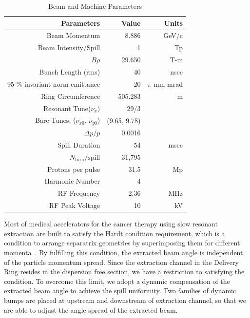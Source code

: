 \documentclass[aps,prstab,onecolumn,preprint,endfloats,11pt]{revtex4-1}
\begin{document}
\begin{table}[hbp]
    \begin{tabular}{rrr}
    \hline
     Parameters                & Value              & Units         \\
    \hline
      Beam Momentum     & 8.886    & GeV/c   \\
      Beam Intensity/Spill         &  1 & Tp       \\
      $B \rho$                  & 29.650             & T-m           \\
      Bunch Length (rms)        & 40                 & nsec          \\
      95 \% invariant norm emittance & 20     & $\pi$ mm-mrad \\
      Ring Circumference  & 505.283            & m             \\
      Resonant Tune($\nu_{x})$   & 29/3 &  \\
      Bare Tunes, ($\nu_{x0}$, $\nu_{y0}$)   & (9.65, 9.78)   &    \\
      $\Delta p / p$           & 0.0016         &    \\
      Spill Duration &  54  & msec \\
      $N_{\text{turn}} / {\text{spill}}$    & 31,795   &    \\
      Protons per pulse     & 31.5  &  Mp   \\
      Harmonic Number           & 4                  &               \\
      RF Frequency              & 2.36               & MHz           \\
      RF Peak Voltage                & 10                 & kV            \\
    \hline
    \end{tabular}
    \caption{\label{table:param}Beam and Machine Parameters}
\end{table}


Most of medical accelerators for the cancer therapy using slow resonant extraction are built to satisfy the Hardt condition requirement, which is a condition to arrange separatrix geometries by superimposing them for different momenta~\cite{hardt,pullia,pimms}. By fulfilling this condition, the extracted beam angle is independent of the particle momentum spread. Since the extraction channel in the Delivery Ring resides in the dispersion free section, we have a restriction to satisfying the condition. To overcome this limit, we adopt a dynamic compensation of the extracted beam angle to achieve the spill uniformity. Two families of dynamic bumps are placed at upstream and downstream of extraction channel, so that we are able to adjust the angle spread of the extracted beam.
\end{document}
